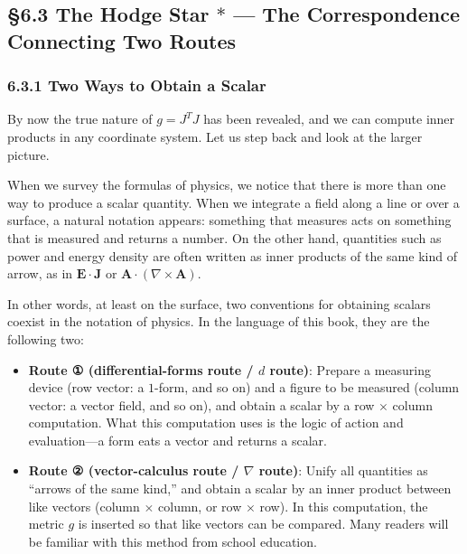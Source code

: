 \documentclass[a4paper,12pt,openany]{book}
\begin{document}
\par\vspace{0.35em}\par

\hypertarget{the-hodge-star-ast-the-correspondence-connecting-two-routes}{%
\subsection{\texorpdfstring{§6.3 The Hodge Star \(\ast\) — The
Correspondence Connecting Two
Routes}{§6.3 The Hodge Star \textbackslash ast — The Correspondence Connecting Two Routes}}\label{the-hodge-star-ast-the-correspondence-connecting-two-routes}}

\hypertarget{two-ways-to-obtain-a-scalar}{%
\subsubsection{6.3.1 Two Ways to Obtain a
Scalar}\label{two-ways-to-obtain-a-scalar}}

By now the true nature of \(g = J^T J\) has been revealed, and we can
compute inner products in any coordinate system. Let us step back and
look at the larger picture.

When we survey the formulas of physics, we notice that there is more
than one way to produce a scalar quantity. When we integrate a field
along a line or over a surface, a natural notation appears: something
that measures acts on something that is measured and returns a number.
On the other hand, quantities such as power and energy density are often
written as inner products of the same kind of arrow, as in
\(\mathbf{E}\cdot\mathbf{J}\) or
\(\mathbf{A}\cdot(\nabla\times\mathbf{A})\).

In other words, at least on the surface, two conventions for obtaining
scalars coexist in the notation of physics. In the language of this
book, they are the following two:

\begin{itemize}
\item
  \textbf{Route ① (differential-forms route / $d$ route)}: Prepare a
  measuring device (row vector: a \(1\)-form, and so on) and a figure to
  be measured (column vector: a vector field, and so on), and obtain a
  scalar by a row \(\times\) column computation. What this computation
  uses is the logic of action and evaluation—a form eats a vector and
  returns a scalar.
\item
  \textbf{Route ② (vector-calculus route / $\nabla$ route)}: Unify all
  quantities as ``arrows of the same kind,'' and obtain a scalar by an
  inner product between like vectors (column \(\times\) column, or row
  \(\times\) row). In this computation, the metric \(g\) is inserted so
  that like vectors can be compared. Many readers will be familiar with
  this method from school education.
\end{itemize}
\end{document}
